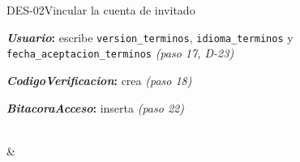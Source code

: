 \begin{fichacu}{DES-02}{Vincular la cuenta de invitado}
{\begin{cudatos}
      \item \textbf{\textit{Usuario}:} escribe \texttt{version\_\allowbreak{}terminos}, \texttt{idioma\_\allowbreak{}terminos} y \texttt{fecha\_\allowbreak{}aceptacion\_\allowbreak{}terminos} \textit{(paso 17, \mbox{D-23})}
      \item \textbf{\textit{CodigoVerificacion}:} crea \textit{(paso 18)}
      \item \textbf{\textit{BitacoraAcceso}:} inserta \textit{(paso 22)}
    \end{cudatos}} \\
   &  \\ \hline
\end{fichacu}
\clearpage
